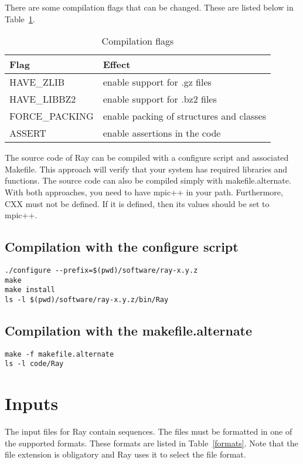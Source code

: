 \documentclass{article}
\begin{document}
There are some compilation flags that can be changed. These are listed below in Table~\ref{flags}.


\begin{table}[h]
\caption{Compilation flags}\label{flags}
\begin{tabular}{ll}
\hline
Flag & Effect  \\
\hline
HAVE\_ZLIB & enable support for .gz files \\
HAVE\_LIBBZ2 & enable support for .bz2 files \\
FORCE\_PACKING & enable packing of structures and classes\\
ASSERT & enable assertions in the code \\
\hline
\end{tabular}
\end{table}

The source code of Ray can be compiled with a configure script and associated Makefile.
This approach will verify that your system has required libraries and functions.
The source code can also be compiled simply with makefile.alternate.
With both approaches, you need to have mpic++ in your path. 
Furthermore, CXX must not be defined. If it is defined, then its values should be set to mpic++.



\subsection{Compilation with the configure script}



\begin{verbatim}
./configure --prefix=$(pwd)/software/ray-x.y.z
make
make install
ls -l $(pwd)/software/ray-x.y.z/bin/Ray
\end{verbatim}


\subsection{Compilation with the makefile.alternate}

\begin{verbatim}
make -f makefile.alternate
ls -l code/Ray
\end{verbatim}

\section{Inputs}

The input files for Ray contain sequences. The files must be formatted in one of the supported formats.
These formats are listed in Table~\ref{formats}. Note that the file extension is obligatory and Ray uses it
to select the file format.
\end{document}
